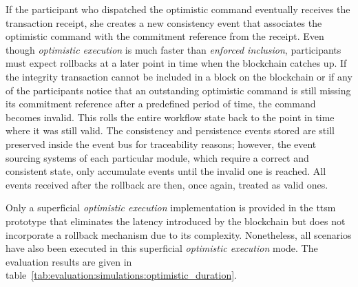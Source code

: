 If the participant who dispatched the optimistic command eventually receives the transaction receipt, she creates a new consistency event that associates the optimistic command with the commitment reference from the receipt. Even though \textit{optimistic execution} is much faster than \textit{enforced inclusion}, participants must expect rollbacks at a later point in time when the blockchain catches up. If the integrity transaction cannot be included in a block on the blockchain or if any of the participants notice that an outstanding optimistic command is still missing its commitment reference after a predefined period of time, the command becomes invalid. This rolls the entire workflow state back to the point in time where it was still valid. The consistency and persistence events stored are still preserved inside the event bus for traceability reasons; however, the event sourcing systems of each particular module, which require a correct and consistent state, only accumulate events until the invalid one is reached. All events received after the rollback are then, once again, treated as valid ones.

Only a superficial \textit{optimistic execution} implementation is provided in the \gls{ttsm} prototype that eliminates the latency introduced by the blockchain but does not incorporate a rollback mechanism due to its complexity. Nonetheless, all scenarios have also been executed in this superficial \textit{optimistic execution} mode. The evaluation results are given in table~\ref{tab:evaluation:simulations:optimistic_duration}.

